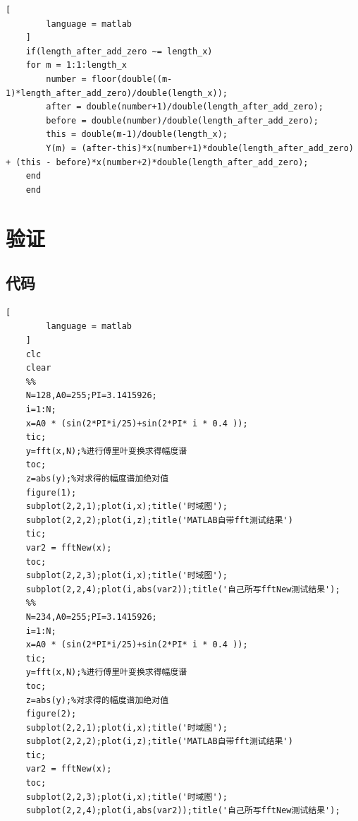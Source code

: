 \documentclass{../source/zju}
\begin{document}
    \begin{lstlisting}[
        language = matlab
    ]
    if(length_after_add_zero ~= length_x)
    for m = 1:1:length_x
        number = floor(double((m-1)*length_after_add_zero)/double(length_x));
        after = double(number+1)/double(length_after_add_zero);
        before = double(number)/double(length_after_add_zero);
        this = double(m-1)/double(length_x);
        Y(m) = (after-this)*x(number+1)*double(length_after_add_zero) + (this - before)*x(number+2)*double(length_after_add_zero);
    end
    end
    \end{lstlisting}

\section{验证}
    \subsection{代码}
    \begin{lstlisting}[
        language = matlab
    ]
    clc
    clear
    %%
    N=128,A0=255;PI=3.1415926;
    i=1:N;
    x=A0 * (sin(2*PI*i/25)+sin(2*PI* i * 0.4 ));
    tic;
    y=fft(x,N);%进行傅里叶变换求得幅度谱
    toc;
    z=abs(y);%对求得的幅度谱加绝对值   
    figure(1);
    subplot(2,2,1);plot(i,x);title('时域图');
    subplot(2,2,2);plot(i,z);title('MATLAB自带fft测试结果')
    tic;
    var2 = fftNew(x);
    toc;
    subplot(2,2,3);plot(i,x);title('时域图');
    subplot(2,2,4);plot(i,abs(var2));title('自己所写fftNew测试结果');
    %%
    N=234,A0=255;PI=3.1415926;
    i=1:N;
    x=A0 * (sin(2*PI*i/25)+sin(2*PI* i * 0.4 ));
    tic;
    y=fft(x,N);%进行傅里叶变换求得幅度谱
    toc;
    z=abs(y);%对求得的幅度谱加绝对值   
    figure(2);
    subplot(2,2,1);plot(i,x);title('时域图');
    subplot(2,2,2);plot(i,z);title('MATLAB自带fft测试结果')
    tic;
    var2 = fftNew(x);
    toc;
    subplot(2,2,3);plot(i,x);title('时域图');
    subplot(2,2,4);plot(i,abs(var2));title('自己所写fftNew测试结果');
    \end{lstlisting}
    
\end{document}

